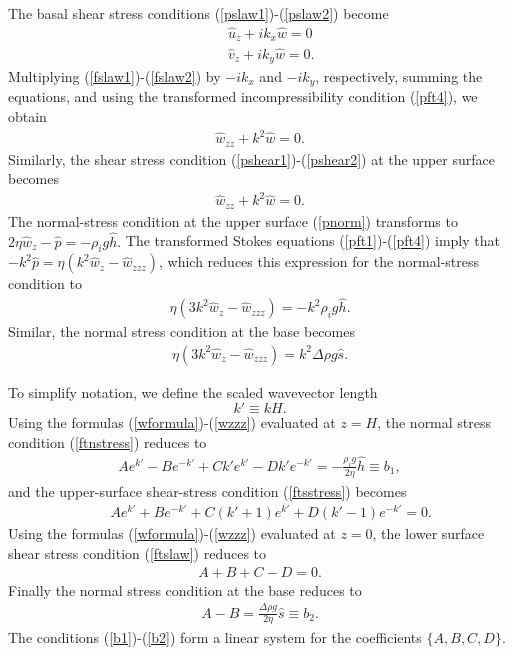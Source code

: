 \documentclass[paper=a4, fontsize=11pt]{article} %
\begin{document}
The basal shear stress conditions (\ref{pslaw1})-(\ref{pslaw2}) become
\begin{eqnarray}
&&\widehat{u}_z + ik_x \widehat{w} = 0 \label{fslaw1} \\
&&\widehat{v}_z + ik_y \widehat{w} = 0. \label{fslaw2}
\end{eqnarray}
Multiplying (\ref{fslaw1})-(\ref{fslaw2}) by $-ik_x$ and $-ik_y$, respectively, summing the equations, and using the transformed incompressibility condition (\ref{pft4}), we obtain
\begin{eqnarray}
\widehat{w}_{zz} + k^2 \widehat{w} = 0.\label{ftslaw}
\end{eqnarray}
Similarly, the shear stress condition (\ref{pshear1})-(\ref{pshear2}) at the upper surface becomes
\begin{eqnarray}
\widehat{w}_{zz} + k^2 \widehat{w} = 0. \label{ftsstress}
\end{eqnarray}
The normal-stress condition at the upper surface (\ref{pnorm}) transforms to
$
2\eta \widehat{w}_{z} - \widehat{p} = -\rho_i g\widehat{h}.
$
The transformed Stokes equations (\ref{pft1})-(\ref{pft4}) imply that
$-k^2 \widehat{p} = \eta(k^2\widehat{w}_z - \widehat{w}_{zzz}) $, which reduces this expression for
the normal-stress condition to
\begin{eqnarray}
\eta (3k^2 \widehat{w}_{z}-\widehat{w}_{zzz})  = -k^2 \rho_i g \widehat{h}.\label{ftnstress}
\end{eqnarray}
Similar, the normal stress condition at the base becomes
\begin{eqnarray}
\eta (3k^2 \widehat{w}_{z}-\widehat{w}_{zzz})  = k^2 \Delta\rho g \widehat{s}. \label{b4alt}
\end{eqnarray}

To simplify notation, we define the scaled wavevector length $${k'} \equiv kH.$$
Using the formulas (\ref{wformula})-(\ref{wzzz}) evaluated at $z=H$,
the normal stress condition (\ref{ftnstress}) reduces to
\begin{eqnarray}
{A} e^{{k'}} - {B} e^{-{k'}} + {C}{k'} e^{{k'}} - {D}{k'} e^{-{k'}}
=- \frac{\rho_i g }{2\eta }\widehat{h} \equiv b_1, \label{b1}
\end{eqnarray}
and the upper-surface shear-stress condition (\ref{ftsstress}) becomes
\begin{eqnarray}
&&A e^{{k'}} + B e^{-{k'}} + C({k'}+1) e^{{k'}} +D({k'}-1) e^{-{k'}} =  0.
\end{eqnarray}
Using the formulas (\ref{wformula})-(\ref{wzzz}) evaluated at $z=0$,
the lower surface shear stress condition (\ref{ftslaw}) reduces to
\begin{eqnarray}
{A} + {B} + {C}  - {D} = 0.
\end{eqnarray}
Finally the normal stress condition at the base reduces to
\begin{eqnarray}
A-B = \frac{\Delta \rho g}{2\eta}\widehat{s}\equiv b_2. \label{b2}
\end{eqnarray}
The conditions (\ref{b1})-(\ref{b2}) form a linear system for the coefficients $\{A,B,C,D\}$.
\end{document}
